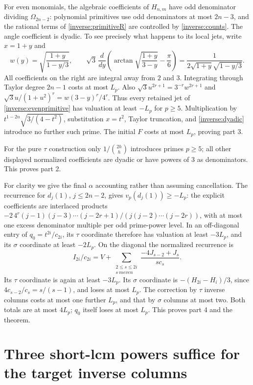 \documentclass[11pt,a4paper]{article}
\numberwithin{equation}{section}
\theoremstyle{definition}\newtheorem{definition}[theorem]{Definition}
\theoremstyle{remark}\newtheorem{remark}[theorem]{Remark}
\begin{document}
For even monomials, the algebraic coefficients of $H_{n,m}$ have odd denominator dividing $\Omega_{2n-2}$: polynomial primitives use odd denominators at most $2n-3$, and the rational terms of \eqref{inverse:primitiveR} are controlled by \eqref{inverse:counts}. The angle coefficient is dyadic. To see precisely what happens to its local jets, write $x=1+y$ and
\[
 w(y)=\sqrt{\frac{1+y}{1-y/3}},\qquad
 \sqrt3\,\frac{d}{dy}\left(\arctan\sqrt{\frac{1+y}{3-y}}-\frac\pi6\right)
   =\frac1{2\sqrt{1+y}\sqrt{1-y/3}}.
\]
All coefficients on the right are integral away from $2$ and $3$. Integrating through Taylor degree $2n-1$ costs at most $L_p$. Also
$\sqrt3u^{2r+1}=3^{-r}w^{2r+1}$ and
$\sqrt3u/(1+u^2)^r=w(3-y)^r/4^r$.
Thus every retained jet of \eqref{inverse:evenprimitive} has valuation at least $-L_p$ for $p\ge5$. Multiplication by $t^{1-2n}\sqrt{3/(4-t^2)}$, substitution $x=t^2$, Taylor truncation, and \eqref{inverse:dyadic} introduce no further such prime. The initial $F$ costs at most $L_p$, proving part 3.

For the pure $\tau$ construction only $1/\binom{2h}h$ introduces primes $p\ge5$; all other displayed normalized coefficients are dyadic or have powers of $3$ as denominators. This proves part 2.

For clarity we give the final $\alpha$ accounting rather than assuming cancellation. The recurrence for $d_j(1)$, $j\le2n-2$, gives $v_p(d_j(1))\ge-L_p$: the explicit coefficients are interlaced products
$-2\,4^r(j-1)(j-3)\cdots(j-2r+1)/(j(j-2)\cdots(j-2r))$, with at most one excess denominator multiple per odd prime-power level. In an off-diagonal entry of $q_0=t^{2i}/c_{2i}$, its $\tau$ coordinate therefore has valuation at least $-3L_p$, and its $\sigma$ coordinate at least $-2L_p$.
On the diagonal the normalized recurrence is
\[
 I_{2i}/c_{2i}=V+\sum_{\substack{2\le s\le2i\\s\ {
m even}}}
                          \frac{-4J_{s-2}+J_s}{s c_s}.
\]
Its $\tau$ coordinate is again at least $-3L_p$. Its $\sigma$ coordinate is
$-(H_{2i}-H_i)/3$, since $4c_{s-2}/c_s=s/(s-1)$, and loses at most $L_p$.
The correction by $\tau$ inverse columns costs at most one further $L_p$, and that by $\sigma$ columns at most two. Both totals are at most $4L_p$; $q_0$ itself loses at most $L_p$. This proves part 4 and the theorem.



\section{Three short-lcm powers suffice for the target inverse columns}
\label{inv3:sec:inverse-three}
\end{document}
